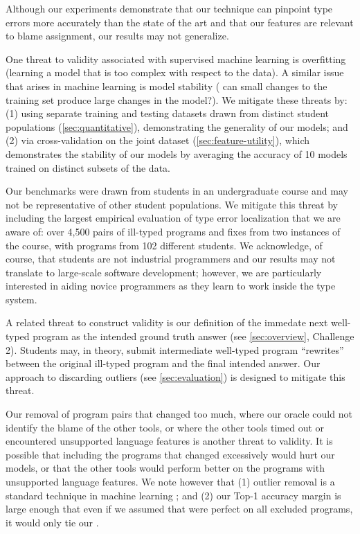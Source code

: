 \label{sec:validity}

Although our experiments demonstrate that our technique can pinpoint type
errors more accurately than the state of the art and that our features are
relevant to blame assignment, our results may not generalize.

One threat to validity associated with supervised machine learning is
overfitting (\ie learning a model that is too complex with respect to
the data).
%
A similar issue that arises in machine learning is model stability (\ie
can small changes to the training set produce large changes in the model?).
%
We mitigate these threats by:
%
(1) using separate training and testing datasets drawn from distinct
student populations (\autoref{sec:quantitative}), demonstrating the
generality of our models; and
%
(2) via cross-validation on the joint dataset
(\autoref{sec:feature-utility}), which demonstrates the stability of our
models by averaging the accuracy of 10 models trained on distinct
subsets of the data.

Our benchmarks were drawn from students in an undergraduate course and
may not be representative of other student populations.
%
We mitigate this threat by including the largest empirical evaluation of
type error localization that we are aware of: over 4,500 pairs of
ill-typed programs and fixes from two instances of the course, with
programs from 102 different students.
%
We acknowledge, of course, that students are not industrial programmers
and our results may not translate to large-scale software development;
however, we are particularly interested in aiding novice programmers
as they learn to work inside the type system.

A related threat to construct validity is our definition of the immedate
next well-typed program as the intended ground truth answer (see
\autoref{sec:overview}, Challenge 2). Students may, in theory, submit
intermediate well-typed program ``rewrites'' between the original ill-typed
program and the final intended answer. Our approach to discarding outliers
(see \autoref{sec:evaluation}) is designed to mitigate this threat.

Our removal of program pairs that changed too much, where our oracle
could not identify the blame of the other tools, or where the other
tools timed out or encountered unsupported language features is another
threat to validity.
%
It is possible that including the programs that changed excessively
would hurt our models, or that the other tools would perform
better on the programs with unsupported language features.
%
We note however that
%
(1) outlier removal is a standard technique in machine learning%
; and
%
(2) our Top-1 accuracy margin is large enough that even if we assumed
that \sherrloc were perfect on all excluded programs, it would
only tie our \hiddenFH. %
%

